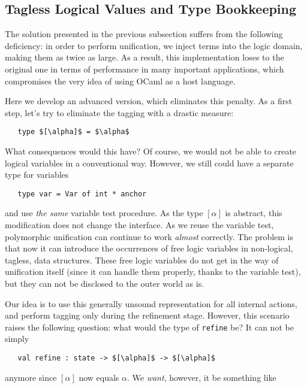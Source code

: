 \subsection{Tagless Logical Values and Type Bookkeeping}

The solution presented in the previous subsection suffers from the following deficiency: in order to perform unification,
we inject terms into the logic domain, making them as twice as large. As a result, this implementation loses to the original one in
terms of performance in many important applications, which compromises the very idea of using OCaml as a host language.

Here we develop an advanced version, which eliminates this penalty. As a first step, let's try to eliminate the tagging with
a drastic measure:

\begin{lstlisting}
   type $[\alpha]$ = $\alpha$
\end{lstlisting}

What consequences would this have? Of course, we would not be able to create logical variables in a conventional way. However,
we still could have a separate type for variables

\begin{lstlisting}
   type var = Var of int * anchor
\end{lstlisting}

and use \emph{the same} variable test procedure. As the type $[\alpha]$ is abstract, this modification does not change the interface.
As we reuse the variable test, polymorphic unification can continue to work \emph{almost} correctly. The problem is that
now it can introduce the occurrences of free logic variables in non-logical, tagless, data structures. These free logic variables
do not get in the way of unification itself (since it can handle them properly, thanks to the variable test), but they can not
be disclosed to the outer world as is.

Our idea is to use this generally unsound representation for all internal actions, and perform tagging only during the refinement
stage. However, this scenario raises the following question: what would the type of \lstinline{refine} be? It can not be simply

\begin{lstlisting}
   val refine : state -> $[\alpha]$ -> $[\alpha]$
\end{lstlisting}

anymore since $[\alpha]$ now equals $\alpha$. We \emph{want}, however, it be something like

